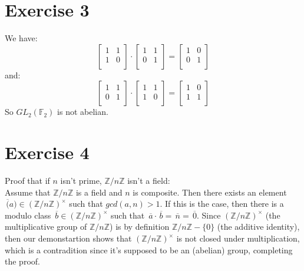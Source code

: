 \documentclass{article}
\newcommand{\Z}{\mathbb{Z}}
\newcommand{\F}{\mathbb{F}}
\newcommand{\olsi}[1]{\,\overline{\!{#1}}}
\begin{document}
    \section*{Exercise 3}
    We have:
    \[ \begin{bmatrix}
        1 & 1 \\
        1 & 0 \\
    \end{bmatrix} \cdot
    \begin{bmatrix}
        1 & 1 \\
        0 & 1 \\
    \end{bmatrix}
    = \begin{bmatrix}
        1 & 0 \\
        0 & 1 \\
    \end{bmatrix} \]
    and: 
    \[ \begin{bmatrix}
        1 & 1 \\
        0 & 1 \\
    \end{bmatrix} \cdot
    \begin{bmatrix}
        1 & 1 \\
        1 & 0 \\
    \end{bmatrix}
    = \begin{bmatrix}
        1 & 0 \\
        1 & 1 \\
    \end{bmatrix} \]
    So $GL_2(\F_2)$ is not abelian.


    \section*{Exercise 4}
    Proof that if $n$ isn't prime, $\Z/n\Z$ isn't a field: \\
    Assume that $\Z/n\Z$ is a field and $n$ is composite.
    Then there exists an element $\olsi(a) \in (\Z/n\Z)^\times$
    such that $gcd(a, n) > 1$.
    If this is the case,
    then there is a modulo class $\olsi{b} \in (\Z/n\Z)^\times$
    such that $\olsi{a} \cdot \olsi{b} = \olsi{n} = \olsi{0}$.
    Since $(\Z/n\Z)^\times$ (the multiplicative group of $\Z/n\Z$)
    is by definition $\Z/n\Z - \{0\}$ (the additive identity),
    then our demonstartion shows that $(\Z/n\Z)^\times$ is not closed
    under multiplication, which is a contradition since it's supposed to
    be an (abelian) group, completing the proof.
\end{document}
